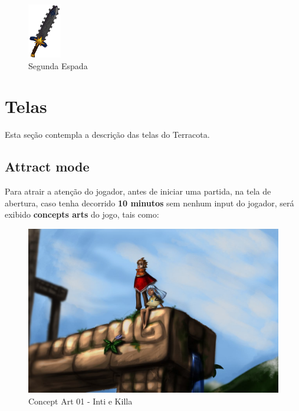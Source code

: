 \documentclass[12pt]{article}
\begin{document}
\begin{figure}[!htb]
    \centering
    \includegraphics[scale=0.5]{sword2.png}
    \caption{Segunda Espada}
    \label{fig:segunda_espada}
\end{figure}

\newpage
\section{Telas}
Esta seção contempla a descrição das telas do Terracota.

\subsection{Attract mode}
Para atrair a atenção do jogador, antes de iniciar uma partida, na tela de
abertura, caso tenha decorrido {\bf 10 minutos} sem nenhum input do jogador,
será exibido {\bf concepts arts} do jogo, tais como:

\begin{figure}[hp]
    \centering
    \includegraphics[scale=0.3]{concept_art_01.jpg}
    \caption{Concept Art 01 - Inti e Killa}
    \label{fig:concept_art_01}
\end{figure}
\end{document}

